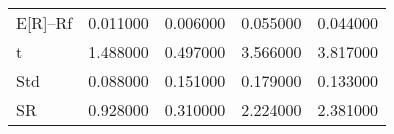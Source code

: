 \begin{tabular}{lrrrr}
\toprule
\midrule
E[R]--Rf & 0.011000 & 0.006000 & 0.055000 & 0.044000 \\
t & 1.488000 & 0.497000 & 3.566000 & 3.817000 \\
Std & 0.088000 & 0.151000 & 0.179000 & 0.133000 \\
SR & 0.928000 & 0.310000 & 2.224000 & 2.381000 \\
\bottomrule
\end{tabular}
